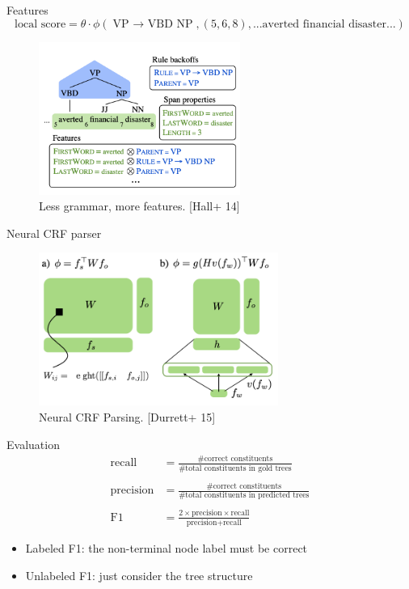 \documentclass[usenames,dvipsnames,notes]{beamer}
\begin{document}
\begin{frame}
    {Features}
    $$
    \text{local score} = \theta \cdot \phi(\text{VP $\rightarrow$ VBD NP}, (5, 6, 8), \text{...averted financial disaster...})
    $$
    \begin{figure}
        \includegraphics[height=5cm]{figures/parse-feature}
        \caption{Less grammar, more features. [Hall+ 14]}
    \end{figure}
\end{frame}

\begin{frame}
    {Neural CRF parser}
    \begin{figure}
        \includegraphics[height=5cm]{figures/neural-crf}
        \caption{Neural CRF Parsing. [Durrett+ 15]}
    \end{figure}
\end{frame}

\begin{frame}
    {Evaluation}
    \begin{align*}
        \text{recall} &= \frac{\# \text{correct constituents}}{\# \text{total constituents in gold trees}}\\\\
        \text{precision} &= \frac{\# \text{correct constituents}}{\# \text{total constituents in predicted trees}} \\\\
        \text{F1} &= \frac{2\times\text{precision}\times\text{recall}}{\text{precision}+\text{recall}}
    \end{align*}
    \begin{itemize}
        \item Labeled F1: the non-terminal node label must be correct
        \item Unlabeled F1: just consider the tree structure
    \end{itemize}
\end{frame}
\end{document}
